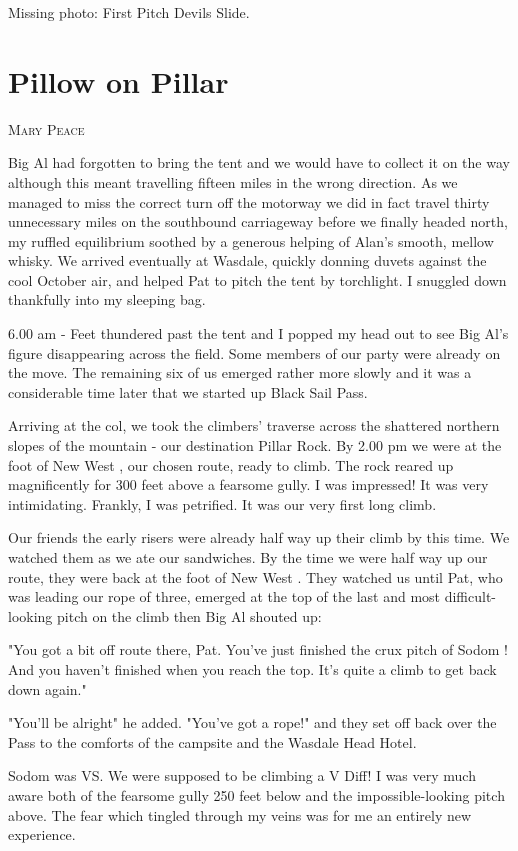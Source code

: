 \documentclass[a5paper,openany,font 10pt]{scrbook}
\makeatletter
\newcommand{\chapterauthor}[1]{%
{\parindent0pt\vspace*{-5pt}%
\linespread{1.1}\large\scshape#1%
\par\nobreak\vspace*{35pt}}
\@afterheading%
}
\makeatother
\begin{document}
Missing photo: First Pitch Devils Slide.

\chapter{Pillow on Pillar}
\label{sec:org90133bb}
\chapterauthor{Mary Peace}


Big Al had forgotten to bring the tent and we would have to
collect it on the way although this meant travelling fifteen
miles in the wrong direction. As we managed to miss the correct
turn off the motorway we did in fact travel thirty unnecessary
miles on the southbound carriageway  before we finally headed
north, my ruffled equilibrium soothed by a generous helping of
Alan's smooth, mellow whisky. We arrived eventually at Wasdale,
quickly donning duvets against the cool October air, and helped
Pat to pitch the tent by torchlight. I snuggled down thankfully
into my sleeping bag.

6.00 am - Feet thundered past the tent and I popped my head
out to see Big Al's figure disappearing across the field. Some
members of our party were already on the move. The remaining six
of us emerged rather more slowly and it was a considerable time
later that we started up Black Sail Pass.

Arriving at the col, we took the climbers' traverse across
the shattered northern slopes of the mountain - our destination
Pillar Rock. By 2.00 pm we were at the foot of    New West   , our
chosen route, ready to climb. The rock reared up magnificently
for 300 feet above a fearsome gully. I was impressed! It was very
intimidating. Frankly, I was petrified. It was our very first
long climb.

Our friends  the early risers   were already half way up
their climb by this time. We watched them as we ate our
sandwiches. By the time we were half way up our route, they were
back at the foot of    New West   . They watched us until Pat, who was
leading our rope of three, emerged at the top of the last and
most difficult-looking pitch on the climb  then Big Al shouted
up:

"You got a bit off route there, Pat. You've just finished
the crux pitch of    Sodom   ! And you haven't finished when you reach
the top. It's quite a climb to get back down again."

"You'll be alright" he added. "You've got a rope!" and they
set off back over the Pass to the comforts of the campsite and
the Wasdale Head Hotel.

Sodom was VS. We were supposed to be climbing a V Diff! I
was very much aware both of the fearsome gully 250 feet below and
the impossible-looking pitch above. The fear which tingled
through my veins was for me an entirely new experience.
\end{document}
